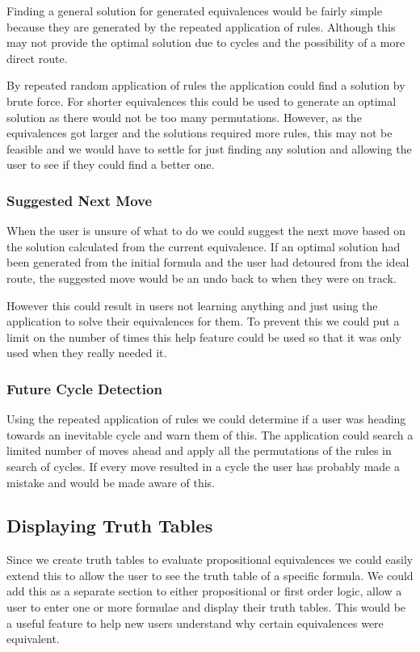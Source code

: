 \documentclass[draft]{report}
\begin{document}
Finding a general solution for generated equivalences would be fairly simple because they are generated by the repeated application of rules. Although this may not provide the optimal solution due to cycles and the possibility of a more direct route.

By repeated random application of rules the application could find a solution by brute force. For shorter equivalences this could be used to generate an optimal solution as there would not be too many permutations. However, as the equivalences got larger and the solutions required more rules, this may not be feasible and we would have to settle for just finding any solution and allowing the user to see if they could find a better one.

\subsubsection{Suggested Next Move}

When the user is unsure of what to do we could suggest the next move based on the solution calculated from the current equivalence. If an optimal solution had been generated from the initial formula and the user had detoured from the ideal route, the suggested move would be an undo back to when they were on track.

However this could result in users not learning anything and just using the application to solve their equivalences for them. To prevent this we could put a limit on the number of times this help feature could be used so that it was only used when they really needed it.

\subsubsection{Future Cycle Detection}

Using the repeated application of rules we could determine if a user was heading towards an inevitable cycle and warn them of this. The application could search a limited number of moves ahead and apply all the permutations of the rules in search of cycles. If every move resulted in a cycle the user has probably made a mistake and would be made aware of this.

\subsection{Displaying Truth Tables}

Since we create truth tables to evaluate propositional equivalences we could easily extend this to allow the user to see the truth table of a specific formula. We could add this as a separate section to either propositional or first order logic, allow a user to enter one or more formulae and display their truth tables. This would be a useful feature to help new users understand why certain equivalences were equivalent.
\end{document}
